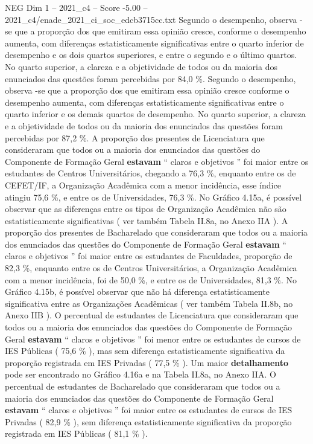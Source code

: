 \begin{textsample}{NEG Dim 1 – 2021\_c4 – Score -5.00 – 2021\_c4/enade\_2021\_ci\_soc\_edcb3715cc.txt}
Segundo o desempenho, observa -se que a proporção dos que emitiram essa opinião cresce, conforme o desempenho aumenta, com diferenças estatisticamente significativas entre o quarto inferior de desempenho e os dois quartos superiores, e entre o segundo e o último quartos.
No quarto superior, a clareza e a objetividade de todos ou da maioria dos enunciados das questões foram percebidas por 84,0 \%.
Segundo o desempenho, observa -se que a proporção dos que emitiram essa opinião cresce conforme o desempenho aumenta, com diferenças estatisticamente significativas entre o quarto inferior e os demais quartos de desempenho.
No quarto superior, a clareza e a objetividade de todos ou da maioria dos enunciados das questões foram percebidas por 87,2 \%.
A proporção dos presentes de Licenciatura que consideraram que todos ou a maioria dos enunciados das questões do Componente de Formação Geral \textbf{estavam} “ claros e objetivos ” foi maior entre os estudantes de Centros Universitários, chegando a 76,3 \%, enquanto entre os de CEFET/IF, a Organização Acadêmica com a menor incidência, esse índice atingiu 75,6 \%, e entre os de Universidades, 76,3 \%.
No Gráfico 4.15a, é possível observar que as diferenças entre os tipos de Organização Acadêmica não são estatisticamente significativas ( ver também Tabela II.8a, no Anexo IIA ).
A proporção dos presentes de Bacharelado que consideraram que todos ou a maioria dos enunciados das questões do Componente de Formação Geral \textbf{estavam} “ claros e objetivos ” foi maior entre os estudantes de Faculdades, proporção de 82,3 \%, enquanto entre os de Centros Universitários, a Organização Acadêmica com a menor incidência, foi de 50,0 \%, e entre os de Universidades, 81,3 \%.
No Gráfico 4.15b, é possível observar que não há diferença estatisticamente significativa entre as Organizações Acadêmicas ( ver também Tabela II.8b, no Anexo IIB ).
O percentual de estudantes de Licenciatura que consideraram que todos ou a maioria dos enunciados das questões do Componente de Formação Geral \textbf{estavam} “ claros e objetivos ” foi menor entre os estudantes de cursos de IES Públicas ( 75,6 \% ), mas sem diferença estatisticamente significativa da proporção registrada em IES Privadas ( 77,5 \% ).
Um maior \textbf{detalhamento} pode ser encontrado no Gráfico 4.16a e na Tabela II.8a, no Anexo IIA.
O percentual de estudantes de Bacharelado que consideraram que todos ou a maioria dos enunciados das questões do Componente de Formação Geral \textbf{estavam} “ claros e objetivos ” foi maior entre os estudantes de cursos de IES Privadas ( 82,9 \% ), sem diferença estatisticamente significativa da proporção registrada em IES Públicas ( 81,1 \% ).

\end{textsample}
